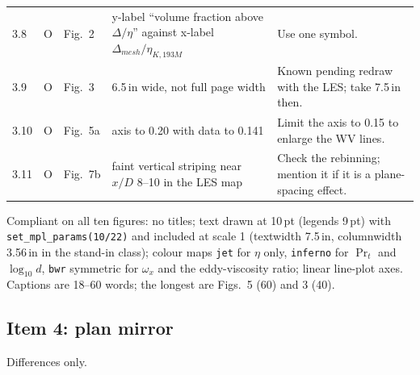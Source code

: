 \documentclass[10pt]{article}
\newcommand{\Op}{O}
\begin{document}
{\begin{longtable}{@{}l l L{1.5cm} L{5.0cm} L{6.6cm}@{}}
3.8 & \Op & Fig.~2 & y-label ``volume fraction above $\Delta/\eta$'' against x-label $\Delta_{mesh}/\eta_{K,193M}$
& Use one symbol. \\
3.9 & \Op & Fig.~3 & 6.5\,in wide, not full page width & Known pending redraw with the LES; take 7.5\,in then. \\
3.10 & \Op & Fig.~5a & axis to 0.20 with data to 0.141 & Limit the axis to 0.15 to enlarge the WV lines. \\
3.11 & \Op & Fig.~7b & faint vertical striping near $x/D$ 8--10 in the LES map & Check the rebinning; mention it
if it is a plane-spacing effect. \\
\bottomrule
\end{longtable}}

Compliant on all ten figures: no titles; text drawn at 10\,pt (legends 9\,pt) with \texttt{set\_mpl\_params(10/22)}
and included at scale 1 (textwidth 7.5\,in, columnwidth 3.56\,in in the stand-in class); colour maps \texttt{jet}
for $\eta$ only, \texttt{inferno} for $\Pr_t$ and $\log_{10}d$, \texttt{bwr} symmetric for $\omega_x$ and the
eddy-viscosity ratio; linear line-plot axes. Captions are 18--60 words; the longest are Figs.~5 (60) and 3 (40).

\subsection{Item 4: plan mirror}

Differences only.
\end{document}
